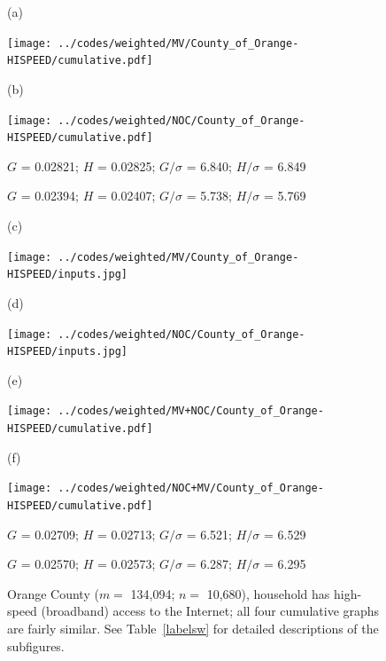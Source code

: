 \documentclass{article}
\newlength{\vertsep}
\newlength{\imsize}
\newlength{\imsized}
\begin{document}
\begin{figure}
\begin{centering}

(a) \parbox{\imsize}{\texttt{[image: ../codes/weighted/MV/County\_of\_Orange-HISPEED/cumulative.pdf]}}
\quad\quad
(b) \parbox{\imsize}{\texttt{[image: ../codes/weighted/NOC/County\_of\_Orange-HISPEED/cumulative.pdf]}}

\parbox{\imsized}{\hfil \footnotesize $G$ = 0.02821; $H$ = 0.02825;
$G/\sigma$ = 6.840; $H/\sigma$ = 6.849}
\parbox{\imsized}{\hfil \footnotesize $G$ = 0.02394; $H$ = 0.02407;
$G/\sigma$ = 5.738; $H/\sigma$ = 5.769}

\vspace{\vertsep}

(c) \parbox{\imsize}{\texttt{[image: ../codes/weighted/MV/County\_of\_Orange-HISPEED/inputs.jpg]}}
\quad\quad
(d) \parbox{\imsize}{\texttt{[image: ../codes/weighted/NOC/County\_of\_Orange-HISPEED/inputs.jpg]}}

\vspace{\vertsep}

(e) \parbox{\imsize}{\texttt{[image: ../codes/weighted/MV+NOC/County\_of\_Orange-HISPEED/cumulative.pdf]}}
\quad\quad
(f) \parbox{\imsize}{\texttt{[image: ../codes/weighted/NOC+MV/County\_of\_Orange-HISPEED/cumulative.pdf]}}

\parbox{\imsized}{\hfil \footnotesize $G$ = 0.02709; $H$ = 0.02713;
$G/\sigma$ = 6.521; $H/\sigma$ = 6.529}
\parbox{\imsized}{\hfil \footnotesize $G$ = 0.02570; $H$ = 0.02573;
$G/\sigma$ = 6.287; $H/\sigma$ = 6.295}

\end{centering}
\caption{Orange County ($m =$ 134,094; $n =$ 10,680),
household has high-speed (broadband) access to the Internet;
all four cumulative graphs are fairly similar.
See Table~\ref{labelsw} for detailed descriptions of the subfigures.}
\label{orange}
\end{figure}
\end{document}
